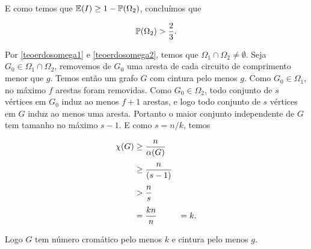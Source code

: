 E como temos que $\mathbb{E}(I) \geq 1 - \mathbb{P}(\Omega_2)$, concluímos que

\begin{equation}\label{teoerdosomega2}
\mathbb{P}(\Omega_2) > \frac{2}{3}.
\end{equation}

Por \ref{teoerdosomega1} e \ref{teoerdosomega2}, temos que $\Omega_1 \cap \Omega_2 \neq \emptyset$. Seja $G_0 \in \Omega_1 \cap \Omega_2$, removemos de $G_0$ uma aresta de cada circuito de comprimento menor que $g$. Temos então um grafo $G$ com cintura pelo menos $g$. Como $G_0 \in \Omega_1$, no máximo $f$ arestas foram removidas. Como $G_0 \in \Omega_2$, todo conjunto de $s$ vértices em $G_0$ induz ao menos $f+1$ arestas, e logo todo conjunto de $s$ vértices em $G$ induz ao menos uma aresta. Portanto o maior conjunto independente de $G$ tem tamanho no máximo $s-1$. E como $s = n/k$, temos

\begin{equation*}
\setlength{\jot}{6pt}
\begin{aligned}
\chi(G) &\geq \frac{n}{\alpha(G)} \\
&\geq \frac{n}{(s-1)} \\
&> \frac{n}{s}\\
&= \frac{kn}{n} & = k.
\end{aligned}
\end{equation*}

Logo $G$ tem número cromático pelo menos $k$ e cintura pelo menos $g$.






